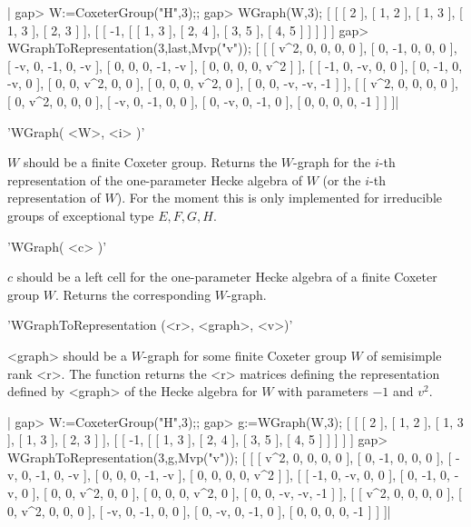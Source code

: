 |    gap> W:=CoxeterGroup("H",3);;
    gap> WGraph(W,3);                     
    [ [ [ 2 ], [ 1, 2 ], [ 1, 3 ], [ 1, 3 ], [ 2, 3 ] ], 
      [ [ -1, [ [ 1, 3 ], [ 2, 4 ], [ 3, 5 ], [ 4, 5 ] ] ] ] ]
    gap> WGraphToRepresentation(3,last,Mvp("v"));
    [ [ [ v^2, 0, 0, 0, 0 ], [ 0, -1, 0, 0, 0 ], [ -v, 0, -1, 0, -v ], 
        [ 0, 0, 0, -1, -v ], [ 0, 0, 0, 0, v^2 ] ], 
      [ [ -1, 0, -v, 0, 0 ], [ 0, -1, 0, -v, 0 ], [ 0, 0, v^2, 0, 0 ], 
        [ 0, 0, 0, v^2, 0 ], [ 0, 0, -v, -v, -1 ] ], 
      [ [ v^2, 0, 0, 0, 0 ], [ 0, v^2, 0, 0, 0 ], [ -v, 0, -1, 0, 0 ], 
        [ 0, -v, 0, -1, 0 ], [ 0, 0, 0, 0, -1 ] ] ]|


'WGraph( <W>, <i> )'

$W$  should be a finite Coxeter group. Returns the $W$-graph for the $i$-th
representation  of the  one-parameter Hecke  algebra of  $W$ (or the $i$-th
representation  of  $W$).  For  the  moment  this  is  only implemented for
irreducible groups of exceptional type $E, F, G, H$.

'WGraph( <c> )'

$c$  should be a left cell for  the one-parameter Hecke algebra of a finite
Coxeter group $W$. Returns the corresponding $W$-graph.


'WGraphToRepresentation (<r>, <graph>, <v>)'

<graph>  should  be  a  $W$-graph  for  some  finite  Coxeter  group $W$ of
semisimple  rank <r>.  The function  returns the  <r> matrices defining the
representation  defined  by  <graph>  of  the  Hecke  algebra  for $W$ with
parameters $-1$ and $v^2$.

|    gap> W:=CoxeterGroup("H",3);;
    gap> g:=WGraph(W,3);                     
    [ [ [ 2 ], [ 1, 2 ], [ 1, 3 ], [ 1, 3 ], [ 2, 3 ] ], 
      [ [ -1, [ [ 1, 3 ], [ 2, 4 ], [ 3, 5 ], [ 4, 5 ] ] ] ] ]
    gap> WGraphToRepresentation(3,g,Mvp("v"));
    [ [ [ v^2, 0, 0, 0, 0 ], [ 0, -1, 0, 0, 0 ], [ -v, 0, -1, 0, -v ], 
        [ 0, 0, 0, -1, -v ], [ 0, 0, 0, 0, v^2 ] ], 
      [ [ -1, 0, -v, 0, 0 ], [ 0, -1, 0, -v, 0 ], [ 0, 0, v^2, 0, 0 ], 
        [ 0, 0, 0, v^2, 0 ], [ 0, 0, -v, -v, -1 ] ], 
      [ [ v^2, 0, 0, 0, 0 ], [ 0, v^2, 0, 0, 0 ], [ -v, 0, -1, 0, 0 ], 
        [ 0, -v, 0, -1, 0 ], [ 0, 0, 0, 0, -1 ] ] ]|

